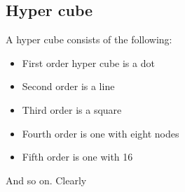 \documentclass[11pt,a4paper,titlepage,dvipsnames,cmyk]{scrartcl}
\begin{document}
\subsection{Hyper cube}%
\label{sub:Hyper cube}
A hyper cube consists of the following:

\begin{itemize}
    \item First order hyper cube is a dot
    \item Second order is a line
    \item Third order is a square
    \item Fourth order is one with eight nodes
    \item Fifth order is one with 16
\end{itemize}

And so on. Clearly 
\end{document}
